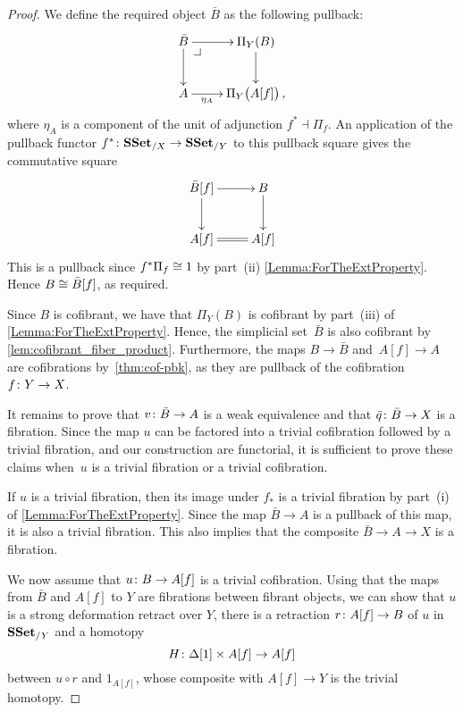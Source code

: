 \documentclass[reqno,10pt,a4paper,oneside,draft]{amsart}
\begin{document}
\begin{proof} We define the required object $\bar{B}$ as the following pullback:
\[\xymatrix{
\bar{B} \ar[d] \ar[r] \drpullback & \Pi_Y(B) \ar[d] \\
A \ar[r]_-{\eta_{A}} & \Pi_Y \big( A[f]  \big) \, ,
}\]
where $\eta_{A}$ is  a component of the unit of adjunction  $f^* \dashv \Pi_f$. An application of the pullback functor $f^* \colon \mathbf{SSet}_{/X} \to \mathbf{SSet}_{/Y}$ to this pullback square gives the commutative square
\[\xymatrix{
\bar{B}[f] \ar[d] \ar[r]  & B \ar[d] \\
A[f] \ar@{=}[r] &A[f] 
}\]
This is a pullback since $f^* \Pi_f \cong 1$ by part~(ii) \cref{Lemma:ForTheExtProperty}. Hence 
$B \cong \bar{B}[f]$, as required.


Since $B$ is cofibrant, we have that $\Pi_Y(B)$ is cofibrant by part~(iii) of  \cref{Lemma:ForTheExtProperty}. Hence, the simplicial set~$\bar{B}$  is also cofibrant by \cref{lem:cofibrant_fiber_product}. Furthermore, the maps $B \rightarrow \bar{B}$ and~$A[f] \rightarrow A$ are cofibrations by~\cref{thm:cof-pbk}, as they are pullback of the cofibration~$f \colon Y \rightarrow X$.





It remains to prove that $v \colon \bar{B} \rightarrow A$ is a weak equivalence and that 
$\bar{q} \colon \bar{B} \rightarrow X$ is a fibration. Since the map $u$ can be factored into a trivial cofibration followed by a trivial fibration, and our construction are functorial, it is sufficient to prove these claims when~$u$ is a trivial fibration or a trivial cofibration.

If $u$ is a trivial fibration, then its image under $f_*$ is a trivial fibration by 
part~(i) of \cref{Lemma:ForTheExtProperty}. Since the map $\bar{B} \rightarrow A$ is a pullback of this map,
it is also a trivial fibration. This also implies that the composite $\bar{B} \rightarrow A \rightarrow X$ is a fibration.


We now assume that $u \colon B \rightarrow A[f]$ is a trivial cofibration. Using that the maps from $\bar{B}$ and $A[f]$ to $Y$ are fibrations between fibrant objects, we can show that $u$ is a strong deformation retract over $Y$, \ie there is a retraction $r \colon A[f] \rightarrow B$ of $u$ in $\mathbf{SSet}_{/Y}$ and a homotopy 
\[
H \colon \Delta[1] \times A[f] \rightarrow A[f]
\] 
between 
$u \circ r$ and $1_{A[f]}$, whose composite with $A[f] \rightarrow Y$ is the trivial homotopy.


\end{proof}
\end{document}
